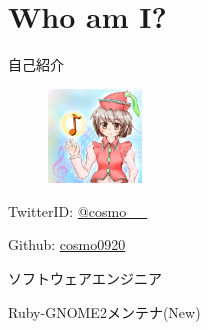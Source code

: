 \section{Who am I?}

\begin{frame}
\begin{block}{自己紹介}
{\Large
\begin{figure}
\begin{center}
\includegraphics[width=2.5cm]{img/icon.png}
\end{center}
\end{figure}

TwitterID: \href{https://twitter.com/cosmo\_\_}{@cosmo\_\_ }

Github: \href{https://github.com/cosmo0920}{cosmo0920 }

ソフトウェアエンジニア

Ruby-GNOME2メンテナ(New)

}
\end{block}
\end{frame}
